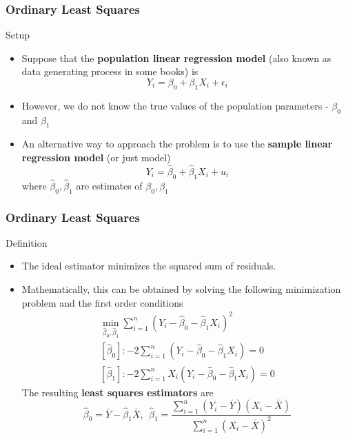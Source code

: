 \documentclass[compress]{beamer}
\begin{document}
\begin{frame}
\frametitle{Ordinary Least Squares}
Setup
\begin{itemize}
\item Suppose that the \textbf{population linear regression model} (also known as data generating process in some books) is
\[
Y_i = \beta_0 + \beta_1X_i + \epsilon_i
\]
\item However, we do not know the true values of the population parameters - $\beta_0$ and $\beta_1$
\item An alternative way to approach the problem is to use the \textbf{sample linear regression model} (or just model)
\[
Y_i = \hat{\beta}_0 +\hat{\beta}_1X_i +u_i
\]
where $\hat{\beta}_0, \hat{\beta}_1$ are estimates of ${\beta}_0, {\beta}_1$

\end{itemize}
\end{frame}

\begin{frame}
\frametitle{Ordinary Least Squares}
Definition
\begin{itemize}
\item The ideal estimator minimizes the squared sum of residuals. 
\item Mathematically, this can be obtained by solving the following minimization problem and the first order conditions
\footnotesize{\begin{gather*}
\min_{\hat{\beta}_0, \hat{\beta}_1} \sum_{i=1}^n (Y_i-\hat{\beta}_0 - \hat{\beta}_1X_i)^2\\
[\hat{\beta}_0]: -2\sum_{i=1}^n(Y_i-\hat{\beta}_0-\hat{\beta}_1X_i)=0\\
[\hat{\beta}_1]: -2\sum_{i=1}^nX_i(Y_i-\hat{\beta}_0-\hat{\beta}_1X_i)=0 
\end{gather*}}\normalsize
The resulting \textbf{least squares estimators} are
\[
\hat{\beta}_0 = \bar{Y}-\hat{\beta}_1\bar{X}, \ \ \hat{\beta}_1=\frac{\sum_{i=1}^n(Y_i-\bar{Y})(X_i-\bar{X})}{\sum_{i=1}^n(X_i-\bar{X})^2}
\]
\end{itemize}
\end{frame}
\end{document}
